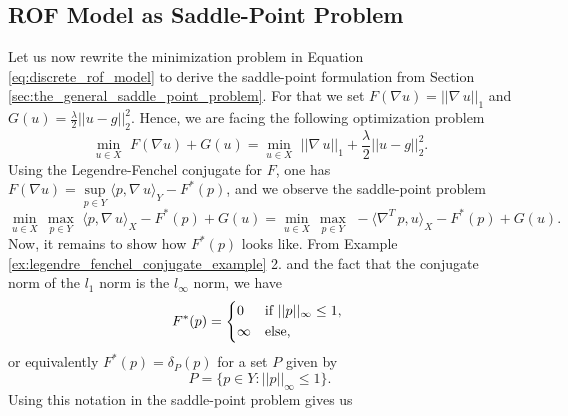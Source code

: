     \subsection{ROF Model as Saddle-Point Problem} %
    \label{sub:rof_model_as_saddle_point_problem}

        Let us now rewrite the minimization problem in Equation \ref{eq:discrete_rof_model} to derive the saddle-point formulation from Section \ref{sec:the_general_saddle_point_problem}. For that we set $F(\nabla u) = ||\nabla \, u||_{1}$ and $G(u) = \frac{\lambda}{2} ||u - g||_{2}^{2}$. Hence, we are facing the following optimization problem
            \begin{equation}
                \min_{u \in X}\,\, F(\nabla u) + G(u) = \min_{u \in X}\,\, ||\nabla \, u||_{1} + \frac{\lambda}{2} ||u - g||_{2}^{2}.
            \label{eq:primal_rof_problem}
            \end{equation}
        Using the Legendre-Fenchel conjugate for $F$, one has $F(\nabla u) = \sup\limits_{p \in Y} \langle p, \nabla \, u \rangle_{Y} - F^{\ast}(p)$, and we observe the saddle-point problem
            \begin{equation}
                \min_{u \in X}\, \max_{p \in Y}\,\, \langle p, \nabla \, u \rangle_{X} - F^{\ast}(p) + G(u) = \min_{u \in X}\, \max_{p \in Y}\,\, -\langle \nabla^{T}\,p, u \rangle_{X} - F^{\ast}(p) + G(u).
            \end{equation}
        Now, it remains to show how $F^{\ast}(p)$ looks like. From Example \ref{ex:legendre_fenchel_conjugate_example} 2. and the fact that the conjugate norm of the $l_{1}$ norm is the $l_{\infty}$ norm, we have
            \begin{equation}
                F^{\ast}(p) =
                    \begin{dcases*}
                        0 & \textnormal{if $||p||_{\infty} \le 1$,} \\
                        \infty & \textnormal{else},
                    \end{dcases*}
                \label{eq:rof_f_star}
            \end{equation}
        or equivalently $F^{\ast}(p) = \delta_{P}(p)$ for a set $P$ given by
            \begin{equation}
                P = \big\{ p \in Y : ||p||_{\infty} \le 1 \big\}.
                \label{eq:the_set_P}
            \end{equation}
        Using this notation in the saddle-point problem gives us
